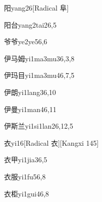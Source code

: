 \begin{verbete}{阳}{yang2}{6}[Radical 阜]
\end{verbete}

\begin{verbete}{阳台}{yang2tai2}{6,5}
\end{verbete}

\begin{verbete}{爷爷}{ye2ye5}{6,6}
\end{verbete}

\begin{verbete}{伊马姆}{yi1ma3mu3}{6,3,8}
\end{verbete}

\begin{verbete}{伊玛目}{yi1ma3mu4}{6,7,5}
\end{verbete}

\begin{verbete}{伊朗}{yi1lang3}{6,10}
\end{verbete}

\begin{verbete}{伊曼}{yi1man4}{6,11}
\end{verbete}

\begin{verbete}{伊斯兰}{yi1si1lan2}{6,12,5}
\end{verbete}

\begin{verbete}{衣}{yi1}{6}[Radical 衣][Kangxi 145]
\end{verbete}

\begin{verbete}{衣甲}{yi1jia3}{6,5}
\end{verbete}

\begin{verbete}{衣服}{yi1fu5}{6,8}
\end{verbete}

\begin{verbete}{衣柜}{yi1gui4}{6,8}
\end{verbete}

